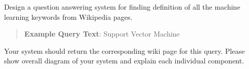 Design a question answering system for finding definition of all the machine learning keywords from Wikipedia pages. 
\begin{quote}
	\textbf{Example Query Text}: Support Vector Machine
\end{quote}
Your system should return the corresponding wiki page for this query.
Please show overall diagram of your system and explain each individual component.

